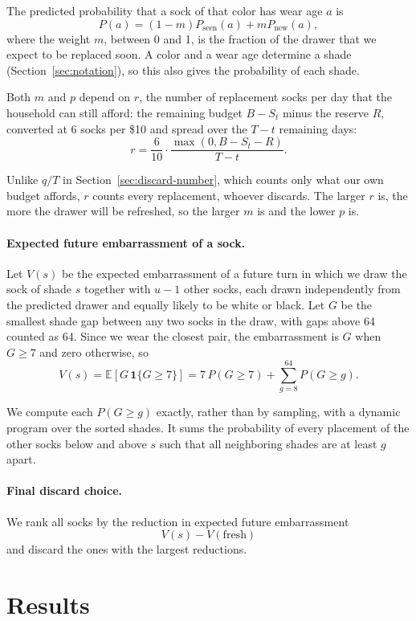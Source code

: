 \documentclass[11pt]{article}
\begin{document}
The predicted probability that a sock of that color has wear age \(a\) is
\[
P(a)
=
(1-m)P_{\mathrm{seen}}(a)
+
mP_{\mathrm{new}}(a),
\]
where the weight \(m\), between 0 and 1, is the fraction of the drawer that we expect to be replaced soon. A color and a wear age determine a shade (Section~\ref{sec:notation}), so this also gives the probability of each shade.

Both \(m\) and \(p\) depend on \(r\), the number of replacement socks per day that the household can still afford: the remaining budget \(B-S_t\) minus the reserve \(R\), converted at 6 socks per \$10 and spread over the \(T-t\) remaining days:
\[
r
=
\frac{6}{10}
\cdot
\frac{\max(0,B-S_t-R)}{T-t}.
\]

Unlike \(q/T\) in Section~\ref{sec:discard-number}, which counts only what our own budget affords, \(r\) counts every replacement, whoever discards. The larger \(r\) is, the more the drawer will be refreshed, so the larger \(m\) is and the lower \(p\) is.

\paragraph{Expected future embarrassment of a sock.}
Let \(V(s)\) be the expected embarrassment of a future turn in which we draw the sock of shade \(s\) together with \(u-1\) other socks, each drawn independently from the predicted drawer and equally likely to be white or black. Let \(G\) be the smallest shade gap between any two socks in the draw, with gaps above 64 counted as 64. Since we wear the closest pair, the embarrassment is \(G\) when \(G\ge 7\) and zero otherwise, so
\[
V(s)
=
\mathbb{E}\!\left[G\,\mathbf{1}\{G\ge 7\}\right]
=
7\,P(G\ge 7)
+
\sum_{g=8}^{64} P(G\ge g).
\]

We compute each \(P(G\ge g)\) exactly, rather than by sampling, with a dynamic program over the sorted shades. It sums the probability of every placement of the other socks below and above \(s\) such that all neighboring shades are at least \(g\) apart.

\paragraph{Final discard choice.}
We rank all socks by the reduction in expected future embarrassment
\[
V(s)-V(\mathrm{fresh})
\]
and discard the ones with the largest reductions.

\section{Results}
\end{document}
